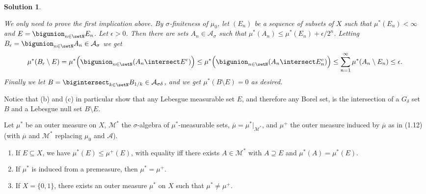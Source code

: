 \documentclass[article, a4paper, 11pt, oneside]{memoir}
\numberwithin{equation}{chapter}
\newcommand{\calM}{\mathcal{M}}
\newcommand{\calA}{\mathcal{A}}
\theoremstyle{nonumberplain}
\newtheorem{solution}{Solution}
\begin{document}
\begin{solution}
\begin{solutionsec}
	\item We only need to prove the first implication above. By $\sigma$-finiteness of $\mu_0$, let $(E_n)$ be a sequence of subsets of $X$ such that $\mu^*(E_n) < \infty$ and $E = \bigunion_{n \in \setN} E_n$. Let $\epsilon > 0$. Then there are sets $A_n \in \calA_\sigma$ such that $\mu^*(A_n) \leq \mu^*(E_n) + \epsilon/2^n$. Letting $B_\epsilon = \bigunion_{n \in \setN} A_n \in \calA_\sigma$ we get
	\begin{equation*}
		\mu^*(B_\epsilon \setminus E)
			= \mu^* \Bigl( \bigunion_{n \in \setN} (A_n \intersect E^c) \Bigr)
			\leq \mu^* \Bigl( \bigunion_{n \in \setN} (A_n \intersect E_n^c) \Bigr)
			\leq \sum_{n=1}^\infty \mu^*(A_n \setminus E_n)
			\leq \epsilon.
	\end{equation*}
	Finally we let $B = \bigintersect_{k \in \setN} B_{1/k} \in \calA_{\sigma\delta}$, and we get $\mu^*(B \setminus E) = 0$ as desired.
\end{solutionsec}
\end{solution}

\begin{remark*}
    Notice that (b) and (c) in particular show that any Lebesgue measurable set $E$, and therefore any Borel set, is the intersection of a $G_\delta$ set $B$ and a Lebesgue null set $B \setminus E$.
\end{remark*}


\begin{exerciseframed*}[20]
    Let $\mu^*$ be an outer measure on $X$, $\calM^*$ the $\sigma$-algebra of $\mu^*$-measurable sets, $\overline\mu = \mu^*|_{\calM^*}$, and $\mu^+$ the outer measure induced by $\overline\mu$ as in (1.12) (with $\overline\mu$ and $\calM^*$ replacing $\mu_0$ and $\calA$).
    \begin{enumerate}
        \item If $E \subseteq X$, we have $\mu^*(E) \leq \mu^+(E)$, with equality iff there exists $A \in \calM^*$ with $A \supseteq E$ and $\mu^*(A) = \mu^*(E)$.

        \item If $\mu^*$ is induced from a premeasure, then $\mu^* = \mu^+$.

        \item If $X = \{0,1\}$, there exists an outer measure $\mu^*$ on $X$ such that $\mu^* \neq \mu^+$.
    \end{enumerate}
\end{exerciseframed*}
\end{document}
